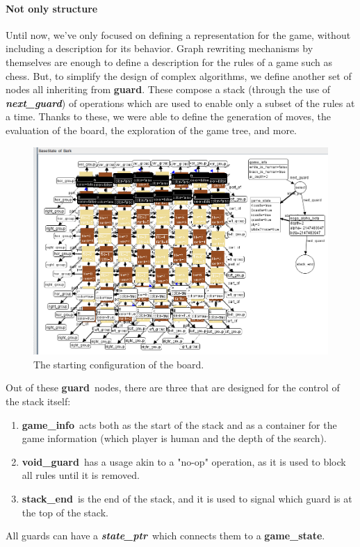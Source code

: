 \documentclass[a4paper, 10pt]{scrartcl}
\newcommand{\noderepr}[1]{\textsf{\textbf{#1}}}
\newcommand{\edgerepr}[1]{\textit{\textbf{#1}}}
\newcommand{\gamestate}{\noderepr{game\_state}}
\newcommand{\guard}{\noderepr{guard}}
\newcommand{\gameinfo}{\noderepr{game\_info}}
\newcommand{\void}{\noderepr{void\_guard}}
\newcommand{\stackend}{\noderepr{stack\_end}}
\newcommand{\stateptr}{\edgerepr{state\_ptr}}
\newcommand{\nextguard}{\edgerepr{next\_guard}}
\begin{document}
    \paragraph*{Not only structure} Until now, we've only focused on defining a representation for the game, without including a description for its behavior. Graph rewriting mechanisms by themselves are enough to define a description for the rules of a game such as chess. But, to simplify the design of complex algorithms, we define another set of nodes all inheriting from \guard. These compose a stack (through the use of \nextguard) of operations which are used to enable only a subset of the rules at a time. Thanks to these, we were able to define the generation of moves, the evaluation of the board, the exploration of the game tree, and more.
    \begin{figure}[H]
        \centering
        \includegraphics[width=.8\linewidth]{images/base_state.png}
        \caption{The starting configuration of the board.}
    \end{figure}
    Out of these \guard\ nodes, there are three that are designed for the control of the stack itself:
    \begin{enumerate}
        \item \gameinfo\ acts both as the start of the stack and as a container for the game information (which player is human and the depth of the search).
        \item \void\ has a usage akin to a "no-op" operation, as it is used to block all rules until it is removed.
        \item \stackend\ is the end of the stack, and it is used to signal which guard is at the top of the stack.
    \end{enumerate}
    All guards can have a \stateptr\ which connects them to a \gamestate.
\end{document}
